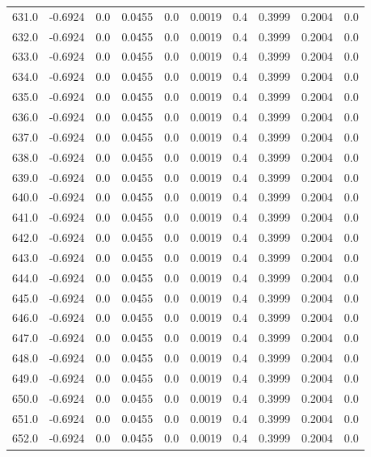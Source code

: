 \begin{longtable}{lrrrrrrrrr}
631.0 & -0.6924 & 0.0 & 0.0455 & 0.0 & 0.0019 & 0.4 & 0.3999 & 0.2004 & 0.0 \\
632.0 & -0.6924 & 0.0 & 0.0455 & 0.0 & 0.0019 & 0.4 & 0.3999 & 0.2004 & 0.0 \\
633.0 & -0.6924 & 0.0 & 0.0455 & 0.0 & 0.0019 & 0.4 & 0.3999 & 0.2004 & 0.0 \\
634.0 & -0.6924 & 0.0 & 0.0455 & 0.0 & 0.0019 & 0.4 & 0.3999 & 0.2004 & 0.0 \\
635.0 & -0.6924 & 0.0 & 0.0455 & 0.0 & 0.0019 & 0.4 & 0.3999 & 0.2004 & 0.0 \\
636.0 & -0.6924 & 0.0 & 0.0455 & 0.0 & 0.0019 & 0.4 & 0.3999 & 0.2004 & 0.0 \\
637.0 & -0.6924 & 0.0 & 0.0455 & 0.0 & 0.0019 & 0.4 & 0.3999 & 0.2004 & 0.0 \\
638.0 & -0.6924 & 0.0 & 0.0455 & 0.0 & 0.0019 & 0.4 & 0.3999 & 0.2004 & 0.0 \\
639.0 & -0.6924 & 0.0 & 0.0455 & 0.0 & 0.0019 & 0.4 & 0.3999 & 0.2004 & 0.0 \\
640.0 & -0.6924 & 0.0 & 0.0455 & 0.0 & 0.0019 & 0.4 & 0.3999 & 0.2004 & 0.0 \\
641.0 & -0.6924 & 0.0 & 0.0455 & 0.0 & 0.0019 & 0.4 & 0.3999 & 0.2004 & 0.0 \\
642.0 & -0.6924 & 0.0 & 0.0455 & 0.0 & 0.0019 & 0.4 & 0.3999 & 0.2004 & 0.0 \\
643.0 & -0.6924 & 0.0 & 0.0455 & 0.0 & 0.0019 & 0.4 & 0.3999 & 0.2004 & 0.0 \\
644.0 & -0.6924 & 0.0 & 0.0455 & 0.0 & 0.0019 & 0.4 & 0.3999 & 0.2004 & 0.0 \\
645.0 & -0.6924 & 0.0 & 0.0455 & 0.0 & 0.0019 & 0.4 & 0.3999 & 0.2004 & 0.0 \\
646.0 & -0.6924 & 0.0 & 0.0455 & 0.0 & 0.0019 & 0.4 & 0.3999 & 0.2004 & 0.0 \\
647.0 & -0.6924 & 0.0 & 0.0455 & 0.0 & 0.0019 & 0.4 & 0.3999 & 0.2004 & 0.0 \\
648.0 & -0.6924 & 0.0 & 0.0455 & 0.0 & 0.0019 & 0.4 & 0.3999 & 0.2004 & 0.0 \\
649.0 & -0.6924 & 0.0 & 0.0455 & 0.0 & 0.0019 & 0.4 & 0.3999 & 0.2004 & 0.0 \\
650.0 & -0.6924 & 0.0 & 0.0455 & 0.0 & 0.0019 & 0.4 & 0.3999 & 0.2004 & 0.0 \\
651.0 & -0.6924 & 0.0 & 0.0455 & 0.0 & 0.0019 & 0.4 & 0.3999 & 0.2004 & 0.0 \\
652.0 & -0.6924 & 0.0 & 0.0455 & 0.0 & 0.0019 & 0.4 & 0.3999 & 0.2004 & 0.0 \\

\end{longtable}
